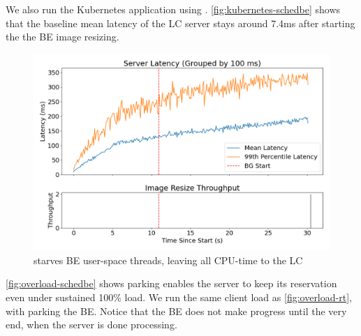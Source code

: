 We also run the Kubernetes application using \beclass{}.
\autoref{fig:kubernetes-schedbe} shows that the baseline mean latency of the LC
server stays around 7.4ms after starting the the BE image resizing.

\begin{figure}[t]
    \centering
    \includegraphics[width=\columnwidth]{graphs/overload-schedbe.png}
    \caption{ \beclass{} starves BE user-space threads, leaving all CPU-time to
    the LC}\label{fig:overload-schedbe}
\end{figure}

\autoref{fig:overload-schedbe} shows parking enables the server to keep its
reservation even under sustained 100\% load. We run the same client load as
\autoref{fig:overload-rt}, with \beclass{} parking the BE. Notice that the BE
does not make progress until the very end, when the server is done processing.
